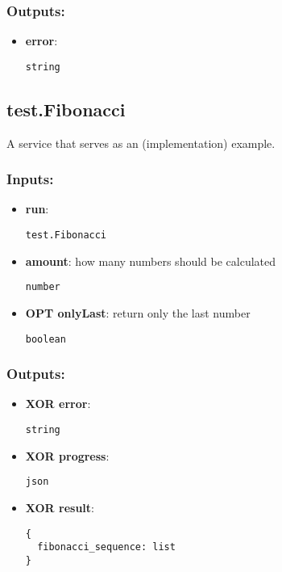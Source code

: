 \subsubsection*{Outputs:}
\begin{itemize}
  \small
    \item \textbf{error}: 
\begin{lstlisting}
string
\end{lstlisting}
  \end{itemize}

\subsection{test.Fibonacci}
\label{ch:builtinservices:test.Fibonacci}
A service that serves as an (implementation) example.
\subsubsection*{Inputs:}
\begin{itemize}
  \small
    \item \textbf{run}: 
\begin{lstlisting}
test.Fibonacci
\end{lstlisting}
    \item \textbf{amount}: how many numbers should be calculated
\begin{lstlisting}
number
\end{lstlisting}
    \item \textbf{OPT onlyLast}: return only the last number
\begin{lstlisting}
boolean
\end{lstlisting}
  \end{itemize}
\subsubsection*{Outputs:}
\begin{itemize}
  \small
    \item \textbf{XOR error}: 
\begin{lstlisting}
string
\end{lstlisting}
    \item \textbf{XOR progress}: 
\begin{lstlisting}
json
\end{lstlisting}
    \item \textbf{XOR result}: 
\begin{lstlisting}
{
  fibonacci_sequence: list
}
\end{lstlisting}
  \end{itemize}

